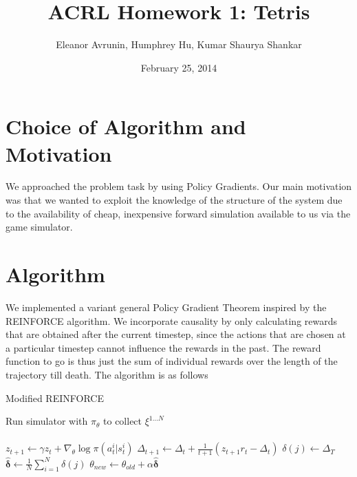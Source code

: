 \documentclass[11pt]{article}
\begin{document}
  

\title{ACRL Homework 1:  Tetris}
\date{February 25, 2014}
\author{Eleanor Avrunin, Humphrey Hu, Kumar Shaurya Shankar}

\maketitle

\section{Choice of Algorithm and Motivation}
We approached the problem task by using Policy Gradients. Our main motivation was that we wanted to exploit the knowledge of the structure of the system due to the availability of cheap, inexpensive forward simulation available to us via the game simulator. 


\section{Algorithm}
We implemented a variant general Policy Gradient Theorem inspired by the REINFORCE algorithm. We incorporate causality by only calculating rewards that are obtained after the current timestep, since the actions that are chosen at a particular timestep cannot influence the rewards in the past. The reward function to go is thus just the sum of individual rewards over the length of the trajectory till death. The algorithm is as follows

\begin{algorithm}
\caption{Modified REINFORCE}
\label{reinforce_alg}
\begin{algorithmic}
\STATE Run simulator with $\pi_{\theta}$ to collect $\xi^{1...N}$\\
\\
\STATE $z_{t+1} \gets \gamma z_t + \nabla_{\theta}\log\pi\left(a_{t}^{i}|s_{t}^{i} \right)$
\STATE $\Delta_{t+1} \gets \Delta_t + \frac{1}{t+1} \left( z_{t+1} r_t - \Delta_t\right)$
\ENDFOR
\STATE $\delta(j) \gets \Delta_T$
\ENDFOR
\STATE $\hat{\mathbf{\delta}} \gets \frac{1}{N} \sum_{i=1}^{N} \delta(j)$
\STATE $\theta_{new} \gets  \theta_{old}+\alpha\hat{\mathbf{\delta}}$
\ENDFOR
\end{algorithmic}
\end{algorithm}
\end{document}
